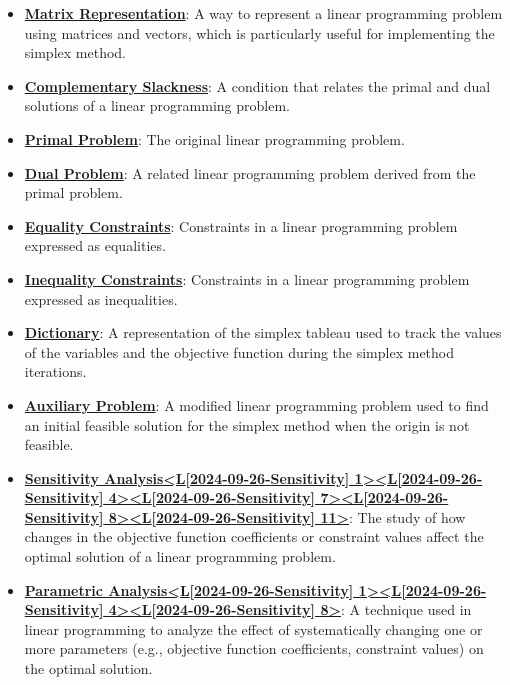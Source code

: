 \documentclass{article}%
\begin{document}
\begin{itemize}[leftmargin=*]
\item \href{https://www.math.purdue.edu/~yipn/421/2024-09-24-SimplexMatrix.pdf#page=1}{\textbf{Matrix Representation}}: A way to represent a linear programming problem using matrices and vectors, which is particularly useful for implementing the simplex method. %
\item \href{https://www.math.purdue.edu/~yipn/421/2024-09-24-SimplexMatrix.pdf#page=14}{\textbf{Complementary Slackness}}: A condition that relates the primal and dual solutions of a linear programming problem. %
\item \href{https://www.math.purdue.edu/~yipn/421/2024-09-24-SimplexMatrix.pdf#page=14}{\textbf{Primal Problem}}: The original linear programming problem. %
\item \href{https://www.math.purdue.edu/~yipn/421/2024-09-24-SimplexMatrix.pdf#page=14}{\textbf{Dual Problem}}: A related linear programming problem derived from the primal problem. %
\item \href{https://www.math.purdue.edu/~yipn/421/2024-09-24-SimplexMatrix.pdf#page=1}{\textbf{Equality Constraints}}: Constraints in a linear programming problem expressed as equalities. %
\item \href{https://www.math.purdue.edu/~yipn/421/2024-09-24-SimplexMatrix.pdf#page=1}{\textbf{Inequality Constraints}}: Constraints in a linear programming problem expressed as inequalities. %
\item \href{https://www.math.purdue.edu/~yipn/421/2024-09-24-SimplexMatrix.pdf#page=15}{\textbf{Dictionary}}: A representation of the simplex tableau used to track the values of the variables and the objective function during the simplex method iterations. %
\item \href{https://www.math.purdue.edu/~yipn/421/2024-09-24-SimplexMatrix.pdf#page=15}{\textbf{Auxiliary Problem}}: A modified linear programming problem used to find an initial feasible solution for the simplex method when the origin is not feasible. %
\item \href{https://www.math.purdue.edu/~yipn/421/2024-09-26-Sensitivity.pdf#page=1}{\textbf{Sensitivity Analysis<L{[}2024{-}09{-}26{-}Sensitivity{]} 1><L{[}2024{-}09{-}26{-}Sensitivity{]} 4><L{[}2024{-}09{-}26{-}Sensitivity{]} 7><L{[}2024{-}09{-}26{-}Sensitivity{]} 8><L{[}2024{-}09{-}26{-}Sensitivity{]} 11>}}: The study of how changes in the objective function coefficients or constraint values affect the optimal solution of a linear programming problem.%
\item \href{https://www.math.purdue.edu/~yipn/421/2024-09-26-Sensitivity.pdf#page=1}{\textbf{Parametric Analysis<L{[}2024{-}09{-}26{-}Sensitivity{]} 1><L{[}2024{-}09{-}26{-}Sensitivity{]} 4><L{[}2024{-}09{-}26{-}Sensitivity{]} 8>}}: A technique used in linear programming to analyze the effect of systematically changing one or more parameters (e.g., objective function coefficients, constraint values) on the optimal solution.%

\end{itemize}
\end{document}
